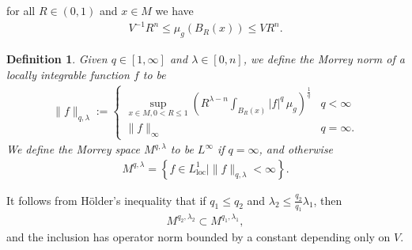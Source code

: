 \documentclass[12pt]{amsart}
\renewcommand{\1}{{\mathbf 1}}
\theoremstyle{others}
\newtheorem{defn}[thm]{Definition}
\numberwithin{equation}{section}
\begin{document}
for all \(R \in (0, 1)\) and \(x \in M\) we have
 \begin{align}\label{preliminaries:volume}
     V^{-1}R^n \leq %
     \mu_g(B_R(x)) \leq VR^n.
 \end{align} 
        \begin{defn}\label{defn:Morreydefinition}
		 Given \(q \in [1, \infty]\) and \(\lambda \in [0, n]\), we define the Morrey norm of a locally integrable function \(f\) to be 
    \begin{align*}
        \|f\|_{q, \lambda} := 
        \begin{cases}
            \sup_{x \in M, 0 < R \leq 1} \left(R^{\lambda-n} \int_{B_R(x)} |f|^q \, \mu_g\right)^{\frac{1}{q}} & q < \infty \\
            \|f\|_\infty & q = \infty.
        \end{cases}
    \end{align*} We define the Morrey space \(M^{q, \lambda}\) to be \(L^\infty\) if \(q = \infty\), and otherwise
		\begin{align}
		M^{q, \lambda} = \left\{f \in L_{\text{loc}}^1 \mid \|f\|_{q, \lambda} < \infty\right\}. \nonumber
		\end{align}
	\end{defn} 
	
It follows from H{\"o}lder's inequality that if \(q_1 \leq q_2\) and \(\lambda_2 \leq \frac{q_2}{q_1}\lambda_1\), then 
    \begin{align}\label{preliminaries:Morreyembedding}
        M^{q_2, \lambda_2} \subset M^{q_1, \lambda_1},
    \end{align} and the inclusion has operator norm bounded by a constant depending only on \(V\). 

 
\end{document}
